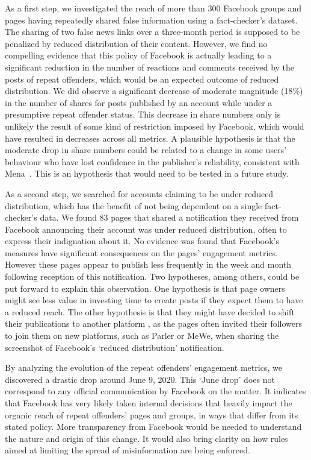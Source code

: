 \documentclass[11pt,a4paper]{article}
\begin{document}
As a first step, we investigated the reach of more than 300 Facebook groups and pages having repeatedly shared false information using a fact-checker's dataset. 
The sharing of two false news links over a three-month period is supposed to be penalized by reduced distribution of their content. 
However, we find no compelling evidence that this policy of Facebook is actually leading to a significant reduction in the number of reactions and comments received by the posts of repeat offenders, which would be an expected outcome of reduced distribution. 
We did observe a significant decrease of moderate magnitude (18\%) in the number of shares for posts published by an account while under a presumptive repeat offender status. 
This decrease in share numbers only is unlikely the result of some kind of restriction imposed by Facebook, which would have resulted in decreases across all metrics. 
A plausible hypothesis is that the moderate drop in share numbers could be related to a change in some users’ behaviour who have lost confidence in the publisher’s reliability, consistent with Mena~. 
This is an hypothesis that would need to be tested in a future study. 

As a second step, we searched for accounts claiming to be under reduced distribution, which has the benefit of not being dependent on a single fact-checker’s data. 
We found 83 pages that shared a notification they received from Facebook announcing their account was under reduced distribution, often to express their indignation about it. 
No evidence was found that Facebook’s measures have significant consequences on the pages’ engagement metrics. 
However these pages appear to publish less frequently in the week and month following reception of this notification. 
Two hypotheses, among others, could be put forward to explain this observation. 
One hypothesis is that page owners might see less value in investing time to create posts if they expect them to have a reduced reach. 
The other hypothesis is that they might have decided to shift their publications to another platform \citep{rogers2020deplatforming, rauchfleisch2021deplatforming}, as the pages often invited their followers to join them on new platforms, such as Parler or MeWe, when sharing the screenshot of Facebook's `reduced distribution' notification.

By analyzing the evolution of the repeat offenders’ engagement metrics, we discovered a drastic drop around June 9, 2020. 
This `June drop' does not correspond to any official communication by Facebook on the matter. 
It indicates that Facebook has very likely taken internal decisions that heavily impact the organic reach of repeat offenders' pages and groups, in ways that differ from its stated policy. 
More transparency from Facebook would be needed to understand the nature and origin of this change. 
It would also bring clarity on how rules aimed at limiting the spread of misinformation are being enforced.
\end{document}

